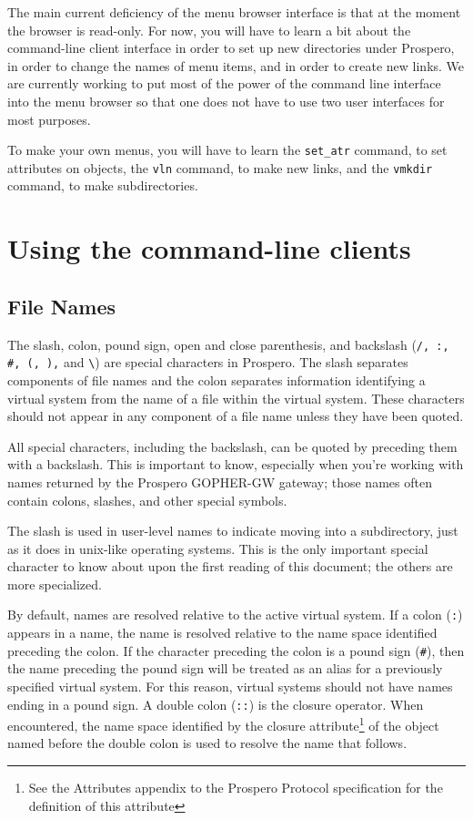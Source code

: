 The main current deficiency of the menu browser interface is that at
the moment the browser is read-only.  For now, you will have to learn
a bit about the command-line client interface in order to set up new
directories under Prospero, in order to change the names of menu
items, and in order to create new links.  We are currently working to
put most of the power of the command line interface into the menu
browser so that one does not have to use two user interfaces for most
purposes. 

To make your own menus, you will have to learn the {\tt set\_atr}
command, to set attributes on objects, the {\tt vln} command, to make
new links, and the {\tt vmkdir} command, to make subdirectories.

\section{Using the command-line clients}

\subsection{File Names}

The slash, colon, pound sign, open and close parenthesis, and backslash
({\tt /, :, \#, (, ),} and \verb"\") are special characters in
Prospero.  The slash separates components of file names and the colon
separates information identifying a virtual system from the name of a
file within the virtual system.  These characters should not appear in
any component of a file name unless they have been quoted.

All special characters, including the backslash, can be quoted by
preceding them with a backslash.  This is important to know,
especially when you're working with names returned by the Prospero
GOPHER-GW gateway; those names often contain colons, slashes, and other special
symbols.

The slash is used in user-level names to indicate moving into a
subdirectory, just as it does in {\sc unix}-like operating systems.
This is the only important special character to know about upon the
first reading of this document; the others are more specialized.

By default, names are resolved relative to the active virtual system.
If a colon ({\tt :}) appears in a name, the name is resolved relative
to the name space identified preceding the colon.  If the character
preceding the colon is a pound sign ({\tt \#}), then the name
preceding the pound sign will be treated as an alias for a previously
specified virtual system.  For this reason, virtual systems should not
have names ending in a pound sign.  A double colon ({\tt ::}) is the
closure operator.  When encountered, the name space identified by the
{\sc closure} attribute\footnote{See the Attributes appendix to the Prospero
Protocol specification for the definition of this attribute} of the
object named before the double colon is used to resolve the name that
follows.

